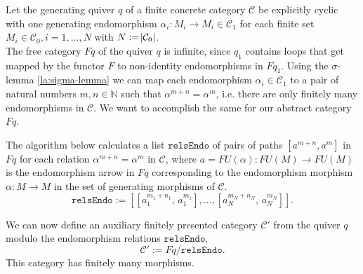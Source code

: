 \begin{remark}
Let the generating quiver $q$ of a finite concrete category $\mathcal{C}$ be explicitly cyclic with one generating endomorphism
$\alpha_{i} : M_{i} \rightarrow M_{i} \in \mathcal{C}_{1}$ for each finite set $M_{i} \in \mathcal{C}_{0}, i = 1,\dots,N$
with $N := \abs{\mathcal{C}_{0}}$.\\
The free category $Fq$ of the quiver $q$ is infinite, since $q_{1}$ contains loops that get mapped by the functor $F$ to non-identity
endomorphisms in $Fq_{1}$.
Using the $\sigma$-lemma \ref{la:sigma-lemma} we can map each endomorphism $\alpha_{i} \in \mathcal{C}_{1}$ to a pair
of natural numbers $m, n \in \mathbb{N}$ such that $\alpha^{m+n} = \alpha^{m}$, i.e. there
are only finitely many endomorphisms in $\mathcal{C}$. We want to accomplish the same for our abstract category $Fq$.

The algorithm  below calculates a list $\mathtt{relsEndo}$ of pairs of paths $[a^{m+n}, a^{m}]$ in
$Fq$ for each relation $\alpha^{m+n} = \alpha^{m}$ in $\mathcal{C}$, where $a = FU(\alpha) : FU(M) \rightarrow FU(M)$ is the
endomorphism arrow in $Fq$ corresponding to the endomorphism morphism $\alpha : M \rightarrow M$ in the set of
generating morphisms of $\mathcal{C}$.
\begin{equation*}
\mathtt{relsEndo} :=
[ [a_{1}^{m_{1}+n_{1}},\, a_{1}^{m_{1}}], \dots, [a_{N}^{m_{N}+n_{N}},\, a_{N}^{m_{N}}] ].
\end{equation*}

We can now define an auxiliary finitely presented category $\mathcal{C}' $ from the quiver $q$ modulo the endomorphism
relations $\mathtt{relsEndo}$,
\[
\mathcal{C}' := Fq / \mathtt{relsEndo}.
\]
This category has finitely many morphisms.


\end{remark}
